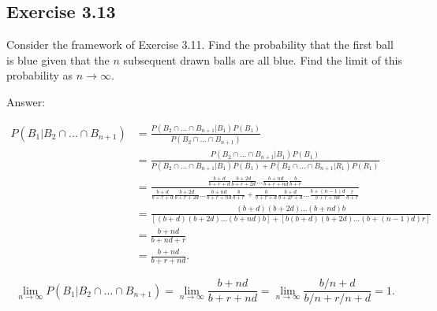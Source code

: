 \documentclass{article}
\begin{document}
\subsection*{Exercise 3.13}

Consider the framework of Exercise 3.11. Find the probability that the first ball is blue given that the $n$ subsequent drawn balls are all blue. Find
the limit of this probability as $n \rightarrow \infty$. 

Answer:

\begin{align*}
P(B_1 \vert B_2 \cap \dots \cap B_{n+1}) &= \frac{P(B_2 \cap \dots \cap B_{n+1} \vert B_1)P(B_1)}{P(B_2\cap \dots \cap B_{n+1})} \\
&= \frac{P(B_2 \cap \dots \cap B_{n+1} \vert B_1)P(B_1)}{P(B_2\cap \dots \cap B_{n+1} \vert B_1)P(B_1) + P(B_2\cap \dots \cap B_{n+1} \vert R_1)P(R_1)} \\
&= \frac{\frac{b+d}{b+r+d}\frac{b+2d}{b+r+2d} \dots \frac{b+nd}{b+r+nd}\frac{b}{b+r}}{\frac{b+d}{b+r+d}\frac{b+2d}{b+r+2d} \dots \frac{b+nd}{b+r+nd}\frac{b}{b+r} + \frac{b}{b+r+d}\frac{b+d}{b+2r+d} \dots \frac{b+(n-1)d}{b+r+nd}\frac{r}{b+r}} \\
&= \frac{(b+d)(b+2d)\dots (b + nd)b}{[(b+d)(b+2d)\dots (b + nd)b] + [b(b+d)(b+2d)\dots (b+(n-1)d)r]} \\
&= \frac{b+nd}{b+nd + r}\\
&= \frac{b+nd}{b+r + nd}.
\end{align*}

$$
\lim_{n\rightarrow \infty} P(B_1 \vert B_2 \cap \dots \cap B_{n+1}) = \lim_{n\rightarrow \infty} \frac{b+nd}{b+r + nd} = \lim_{n\rightarrow \infty} \frac{b/n+d}{b/n+r/n + d} = 1.
$$
\end{document}
